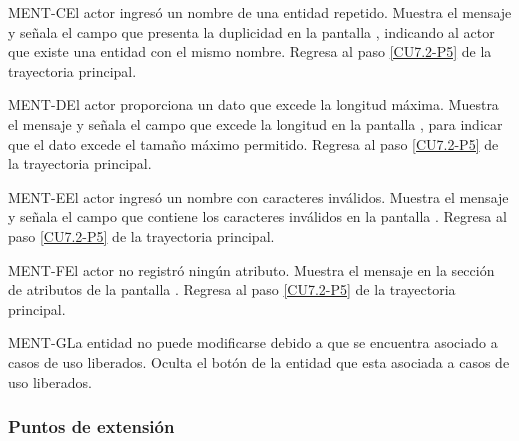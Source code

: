 	\begin{UCtrayectoriaA}{MENT-C}{El actor ingresó un nombre de una entidad repetido.}
		\UCpaso[\UCsist] Muestra el mensaje  y señala el campo que presenta la duplicidad en la pantalla , indicando al actor que existe una entidad con el mismo nombre.
		\UCpaso Regresa al paso \ref{CU7.2-P5} de la trayectoria principal.
	\end{UCtrayectoriaA}

	\begin{UCtrayectoriaA}{MENT-D}{El actor proporciona un dato que excede la longitud máxima.}
		\UCpaso[\UCsist] Muestra el mensaje  y señala el campo que excede la longitud en la pantalla , para indicar que el dato excede el tamaño máximo permitido.
		\UCpaso Regresa al paso \ref{CU7.2-P5} de la trayectoria principal.
	\end{UCtrayectoriaA}

	\begin{UCtrayectoriaA}{MENT-E}{El actor ingresó un nombre con caracteres inválidos.}
	\UCpaso[\UCsist] Muestra el mensaje  y señala el campo que contiene los caracteres inválidos en la pantalla .
	\UCpaso Regresa al paso \ref{CU7.2-P5} de la trayectoria principal.
	\end{UCtrayectoriaA}

	\begin{UCtrayectoriaA}{MENT-F}{El actor no registró ningún atributo.}
	\UCpaso[\UCsist] Muestra el mensaje  en la sección de atributos de la pantalla .
	\UCpaso Regresa al paso \ref{CU7.2-P5} de la trayectoria principal.
	\end{UCtrayectoriaA}


	\begin{UCtrayectoriaA}{MENT-G}{La entidad no puede modificarse debido a que se encuentra asociado a casos de uso liberados.}
		\UCpaso[\UCsist] Oculta el botón \editar de la entidad que esta asociada a casos de uso liberados.
	\end{UCtrayectoriaA}

\subsubsection{Puntos de extensión}

